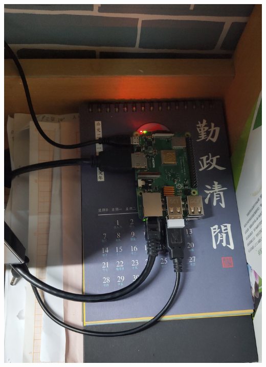 \begin{frame}
    \frametitle{}
    \begin{columns}
        \includegraphics[width=\linewidth]{Assets/raspberrypi-work-as-a-computer.jpg}

\end{columns}
\end{frame}
